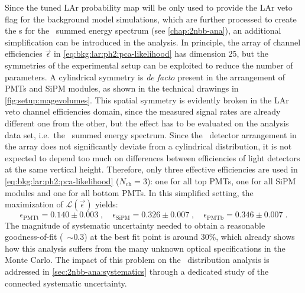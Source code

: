 Since the tuned LAr probability map will be only used to provide the LAr veto flag for the
background model simulations, which are further processed to create the \pdf{}s for the
\bege\ summed energy spectrum (see \cref{chap:2nbb-ana}), an additional simplification can be
introduced in the analysis. In principle, the array of channel efficiencies
$\vec{\epsilon}$ in \cref{eq:bkg:lar:ph2:pca-likelihood} has dimension 25, but the
symmetries of the experimental setup can be exploited to reduce the number of parameters.
A cylindrical symmetry is \emph{de facto} present in the arrangement of PMTs and SiPM
modules, as shown in the technical drawings in \cref{fig:setup:magevolumes}. This spatial
symmetry is evidently broken in the LAr veto channel efficiencies domain, since the
measured signal rates are already different one from the other, but the effect has to be
evaluated on the analysis data set, i.e.~the \bege\ summed energy spectrum. Since the
\bege\ detector arrangement in the array does not significantly deviate from a cylindrical
distribution, it is not expected to depend too much on differences between efficiencies of
light detectors at the same vertical height. Therefore, only three effective efficiencies
are used in \cref{eq:bkg:lar:ph2:pca-likelihood} ($N_\text{ch}=3$): one for all top PMTs,
one for all SiPM modules and one for all bottom PMTs.  In this simplified setting, the
maximization of $\mathcal{L}(\vec{\epsilon})$ yields:
\begin{equation}\label{eq:bkg:lar:ph2:chan-eff}
  \epsilon_\text{PMTt} = 0.140 \pm 0.003 \;, \quad
  \epsilon_\text{SiPM} = 0.326 \pm 0.007 \;, \quad
  \epsilon_\text{PMTb} = 0.346 \pm 0.007 \;.
\end{equation}
The magnitude of systematic uncertainty needed to obtain a reasonable goodness-of-fit
(\pvalue~$\sim 0.3$) at the best fit point is around 30\%, which already shows
how this analysis suffers from the many unknown optical specifications in the Monte Carlo.
The impact of this problem on the \nnbb\ distribution analysis is addressed in
\cref{sec:2nbb-ana:systematics} through a dedicated study of the connected systematic
uncertainty.

